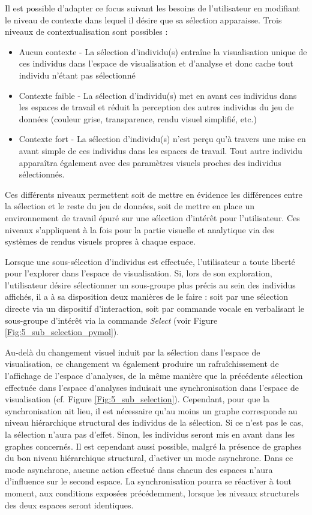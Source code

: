 Il est possible d'adapter ce focus suivant les besoins de l'utilisateur en modifiant le niveau de contexte dans lequel il désire que sa sélection apparaisse. Trois niveaux de contextualisation sont possibles :
\begin{itemize}
  \item Aucun contexte - La sélection d'individu(s) entraîne la visualisation unique de ces individus dans l'espace de visualisation et d'analyse et donc cache tout individu n'étant pas sélectionné
  \item Contexte faible - La sélection d'individu(s) met en avant ces individus dans les espaces de travail et réduit la perception des autres individus du jeu de données (couleur grise, transparence, rendu visuel simplifié, etc.)
  \item Contexte fort - La sélection d'individu(s) n'est perçu qu'à travers une mise en avant simple de ces individus dans les espaces de travail. Tout autre individu apparaîtra également avec des paramètres visuels proches des individus sélectionnés.
\end{itemize}

Ces différents niveaux permettent soit de mettre en évidence les différences entre la sélection et le reste du jeu de données, soit de mettre en place un environnement de travail épuré sur une sélection d’intérêt pour l'utilisateur. Ces niveaux s'appliquent à la fois pour la partie visuelle et analytique via des systèmes de rendus visuels propres à chaque espace.

Lorsque une sous-sélection d'individus est effectuée, l'utilisateur a toute liberté pour l'explorer dans l'espace de visualisation. Si, lors de son exploration, l'utilisateur désire sélectionner un sous-groupe plus précis au sein des individus affichés, il a à sa disposition deux manières de le faire : soit par une sélection directe via un dispositif d'interaction, soit par commande vocale en verbalisant le sous-groupe d’intérêt via la commande \textit{Select} (voir Figure \ref{Fig:5_sub_selection_pymol}).

Au-delà du changement visuel induit par la sélection dans l'espace de visualisation, ce changement va également produire un rafraîchissement de l'affichage de l'espace d'analyses, de la même manière que la précédente sélection effectuée dans l'espace d'analyses induisait une synchronisation dans l'espace de visualisation (cf. Figure \ref{Fig:5_sub_selection}). Cependant, pour que la synchronisation ait lieu, il est nécessaire qu'au moins un graphe corresponde au niveau hiérarchique structural des individus de la sélection. Si ce n'est pas le cas, la sélection n'aura pas d'effet. Sinon, les individus seront mis en avant dans les graphes concernés. Il est cependant aussi possible, malgré la présence de graphes du bon niveau hiérarchique structural, d'activer un mode asynchrone. Dans ce mode asynchrone, aucune action effectué dans chacun des espaces n'aura d'influence sur le second espace. La synchronisation pourra se réactiver à tout moment, aux conditions exposées précédemment, lorsque les niveaux structurels des deux espaces seront identiques.


